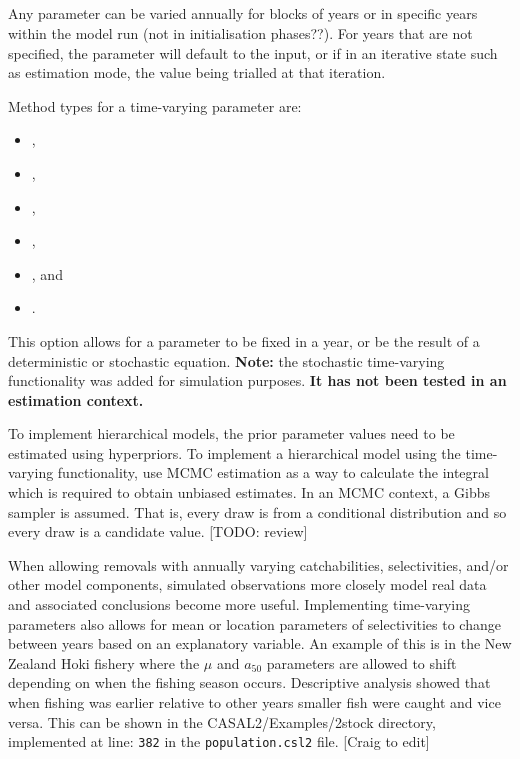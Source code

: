 \subsection{\label{sec:time_var}}

Any parameter can be varied annually for blocks of years or in specific years within the model run (not in initialisation phases??). For years that are not specified, the parameter will default to the input, or if in an iterative state such as estimation mode, the value being trialled at that iteration.

Method types for a time-varying parameter are: 

\begin{itemize}
\item {},
\item {},
\item {},
\item {},
\item {}, and
\item {}.
\end{itemize}

This option allows for a parameter to be fixed in a year, or be the result of a deterministic or stochastic equation. \textbf{Note:} the stochastic time-varying functionality was added for simulation purposes. \textbf{It has not been tested in an estimation context.}

To implement hierarchical models, the prior parameter values need to be estimated using hyperpriors. To implement a hierarchical model using the time-varying functionality, use MCMC estimation as a way to calculate the integral which is required to obtain unbiased estimates. In an MCMC context, a Gibbs sampler is assumed. That is, every draw is from a conditional distribution and so every draw is a candidate value.  [TODO: review]

When allowing removals with annually varying catchabilities, selectivities, and/or other model components, simulated observations more closely model real data and associated conclusions become more useful. Implementing time-varying parameters also allows for mean or location parameters of selectivities to change between years based on an explanatory variable. An example of this is in the New Zealand Hoki fishery where the $\mu$ and $a_{50}$ parameters are allowed to shift depending on when the fishing season occurs. Descriptive analysis showed that when fishing was earlier relative to other years smaller fish were caught and vice versa. This can be shown in the CASAL2/Examples/2stock directory, implemented at line: \texttt{382} in the \texttt{population.csl2} file. [Craig to edit]

